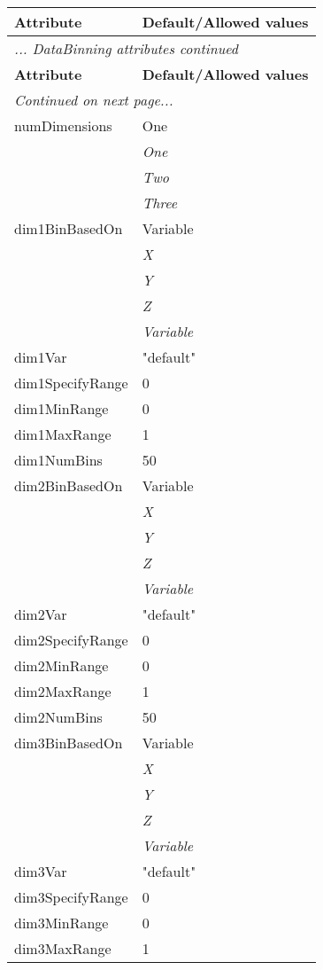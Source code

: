 \documentclass[10pt,a4paper]{report}
\begin{document}
\begin{longtable}{ll}
{\bf Attribute} & {\bf Default/Allowed values} \\
\hline \hline
\endfirsthead
\multicolumn{2}{l}{{\it ... DataBinning attributes continued}} \\
{\bf Attribute} & {\bf Default/Allowed values} \\
\hline \hline
\endhead
\hline
\multicolumn{2}{l}{{\it Continued on next page...}} \\
\endfoot
\hline
\endlastfoot

numDimensions  &  One   \\
 & {\it  One} \\
 & {\it  Two} \\
 & {\it  Three} \\
dim1BinBasedOn  &  Variable   \\
 & {\it  X} \\
 & {\it  Y} \\
 & {\it  Z} \\
 & {\it  Variable} \\
dim1Var  &  "default" \\
dim1SpecifyRange  &  0 \\
dim1MinRange  &  0 \\
dim1MaxRange  &  1 \\
dim1NumBins  &  50 \\
dim2BinBasedOn  &  Variable   \\
 & {\it  X} \\
 & {\it  Y} \\
 & {\it  Z} \\
 & {\it  Variable} \\
dim2Var  &  "default" \\
dim2SpecifyRange  &  0 \\
dim2MinRange  &  0 \\
dim2MaxRange  &  1 \\
dim2NumBins  &  50 \\
dim3BinBasedOn  &  Variable   \\
 & {\it  X} \\
 & {\it  Y} \\
 & {\it  Z} \\
 & {\it  Variable} \\
dim3Var  &  "default" \\
dim3SpecifyRange  &  0 \\
dim3MinRange  &  0 \\
dim3MaxRange  &  1 \\

\end{longtable}
\end{document}
